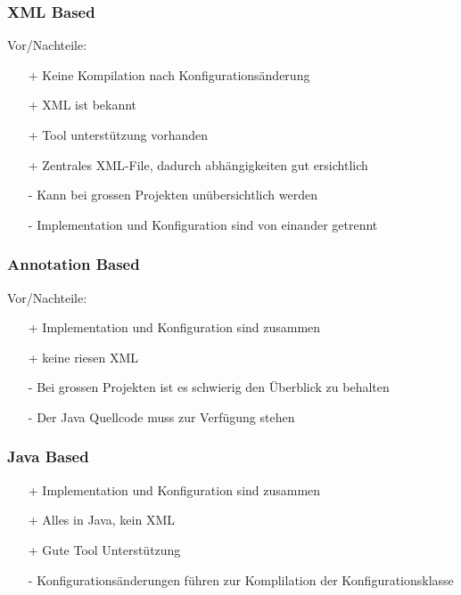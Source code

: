 \documentclass[10pt]{scrartcl}
\begin{document}
\subsubsection{XML Based}
Vor/Nachteile:
\begin{itemize}
	\item[+] Keine Kompilation nach Konfigurationsänderung
	\item[+] XML ist bekannt
	\item[+] Tool unterstützung vorhanden
	\item[+] Zentrales XML-File, dadurch abhängigkeiten gut ersichtlich
	\item[-] Kann bei grossen Projekten unübersichtlich werden
	\item[-] Implementation und Konfiguration sind von einander getrennt
\end{itemize}


\subsubsection{Annotation Based}
Vor/Nachteile:
\begin{itemize}
	\item[+] Implementation und Konfiguration sind zusammen
	\item[+] keine riesen XML
	\item[-] Bei grossen Projekten ist es schwierig den Überblick zu behalten
	\item[-] Der Java Quellcode muss zur Verfügung stehen
\end{itemize}


\subsubsection{Java Based}
\begin{itemize}
	\item[+] Implementation und Konfiguration sind zusammen
	\item[+] Alles in Java, kein XML
	\item[+] Gute Tool Unterstützung
	\item[-] Konfigurationsänderungen führen zur Komplilation der Konfigurationsklasse
\end{itemize}

\end{document}

